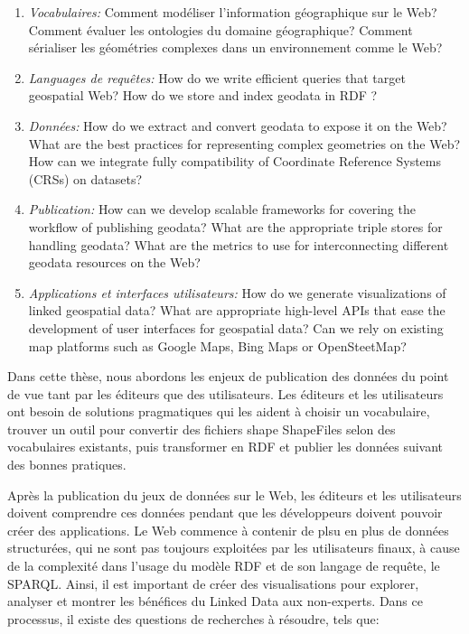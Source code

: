 \documentclass[a4paper,11pt,twoside]{report}
\begin{document}
\begin{enumerate}

\item \textit{Vocabulaires:} Comment modéliser l'information géographique sur le Web? Comment évaluer les ontologies du domaine géographique? Comment sérialiser les géométries complexes dans un environnement comme le Web? 
\item \textit{Languages de requêtes:} How do we write efficient queries that target geospatial Web? How do we store and index geodata in RDF ?
\item \textit{Données:} How do we extract and convert geodata to expose it on the Web? What are the best practices for representing complex geometries on the Web? How can we integrate fully compatibility of Coordinate Reference Systems (CRSs) on datasets? 
\item \textit{Publication:} How can we develop scalable frameworks for covering the workflow of publishing geodata? What are the appropriate triple stores for handling geodata? What are the metrics to use for interconnecting different geodata resources on the Web?  
\item \textit{Applications et interfaces utilisateurs:} How do we generate visualizations of linked geospatial data? What are appropriate high-level APIs that ease the development of user interfaces for geospatial data? Can we rely on existing map platforms such as Google Maps, Bing Maps or OpenSteetMap?
\end{enumerate}


Dans cette thèse, nous abordons les enjeux de publication des données du point de vue tant par les éditeurs que des utilisateurs. Les éditeurs et les utilisateurs ont besoin de solutions pragmatiques qui les aident à choisir un vocabulaire, trouver un outil pour convertir des fichiers shape  ShapeFiles selon des vocabulaires existants, puis transformer en RDF et publier les données suivant des bonnes pratiques.

 
Après la publication du jeux de données sur le Web, les éditeurs et les utilisateurs doivent comprendre ces données pendant que les développeurs doivent pouvoir créer des applications. Le Web commence à contenir de plsu en plus de données structurées, qui ne sont pas toujours exploitées par les utilisateurs finaux, à cause de la complexité dans l'usage du modèle RDF et de son langage de requête, le SPARQL. Ainsi, il est important de créer des visualisations pour explorer, analyser et montrer les bénéfices du Linked Data aux non-experts. Dans ce processus, il existe des questions de recherches à résoudre, tels que:
\end{document}
